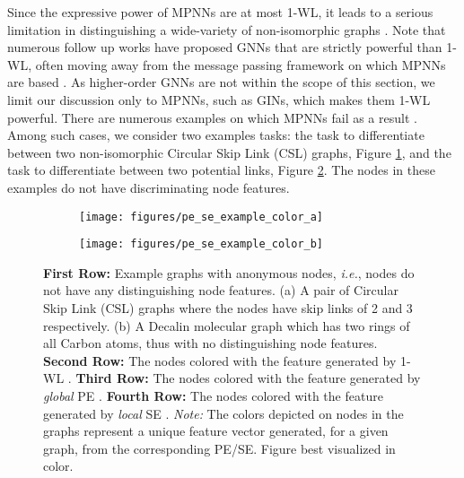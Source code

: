 \documentclass{article}
\begin{document}
Since the expressive power of MPNNs are at most 1-WL, it leads to a serious limitation in distinguishing a wide-variety of non-isomorphic graphs \cite{sato2020survey}. Note that numerous follow up works have proposed GNNs that are strictly powerful than 1-WL, often moving away from the message passing framework \cite{gilmer2017neural} on which MPNNs are based \cite{morris2019, chen2019equivalence, maron2019provably}. As higher-order GNNs are not within the scope of this section, we limit our discussion only to MPNNs, such as GINs, which makes them 1-WL powerful.
There are numerous examples on which MPNNs fail as a result \cite{sato2020survey}. Among such cases, we consider two examples tasks: the task to differentiate between two non-isomorphic Circular Skip Link (CSL) graphs, Figure \ref{fig:pe_se_example:a}, and the task to differentiate between two potential links, Figure \ref{fig:pe_se_example:b}. The nodes in these examples do not have discriminating node features.





\begin{figure}[ht]
\centering
\begin{subfigure}{.7\textwidth}
  \centering
  \texttt{[image: figures/pe\_se\_example\_color\_a]}
  \subcaption{}
  \label{fig:pe_se_example:a}
\end{subfigure}\hfill \begin{subfigure}{.3\textwidth}
  \centering
  \texttt{[image: figures/pe\_se\_example\_color\_b]}
  \subcaption{}
  \label{fig:pe_se_example:b}
\end{subfigure}
\caption{\textbf{First Row:} Example graphs with anonymous nodes, \textit{i.e.}, nodes do not have any distinguishing node features. (a) A pair of Circular Skip Link (CSL) graphs \cite{murphy2019relational} where the nodes have skip links of 2 and 3 respectively. (b) A Decalin molecular graph which has two rings of all Carbon atoms, thus with no distinguishing node features. \textbf{Second Row:} The nodes colored with the feature generated by 1-WL \cite{weisfeiler1968reduction, xu2018how, morris2019}.
  \textbf{Third Row:} The nodes colored with the feature generated by \textit{global} PE \cite{dwivedi2020benchmarking}. \textbf{Fourth Row:} The nodes colored with the feature generated by \textit{local} SE \cite{dwivedi2022LPE}. \textit{Note:} The colors depicted on nodes in the graphs represent a unique feature vector generated, for a given graph, from the corresponding PE/SE. Figure best visualized in color.}
  \label{fig:pe_se_example}
\end{figure}
\end{document}
